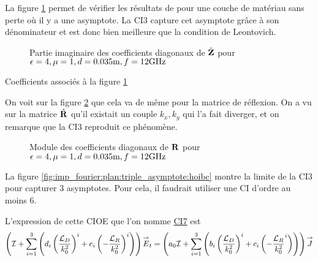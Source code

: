       La figure \ref{fig:imp_fourier:plan:soudais:hoibc} permet de vérifier les résultats de \cite[p.~11]{soudais_3d_2017} pour une couche de matériau sans perte où il y a une asymptote. La CI3 capture cet asymptote grâce à son dénominateur et est donc bien meilleure que la condition de Leontovich.
      \begin{figure}[!hbt]
          \centering
          
          \caption[CIOE sur empilement de P.~Soudais p.~11]{Partie imaginaire des coefficients diagonaux de \(\hat{\mathbf{Z}}\) pour \(\epsilon = 4, \mu = 1, d=0.035\text{m}, f=12\text{GHz}\)}
          \label{fig:imp_fourier:plan:soudais:hoibc}
      \end{figure}
      \begin{table}[!hbt]
        \centering
        \caption{Coefficients associés à la figure \ref{fig:imp_fourier:plan:soudais:hoibc}}
        \label{tab:imp_fourier:plan:soudais:hoibc}
      \end{table}

      On voit sur la figure \ref{fig:reflex_fourier:plan:soudais:hoibc} que cela va de même pour la matrice de réflexion. On a vu sur la matrice \(\hat{\mathbf{R}}\) qu'il existait un couple \(k_x,k_y\) qui l'a fait diverger, et on remarque que la CI3 reproduit ce phénomène.
      \begin{figure}[!hbt]
          \centering
          
          \caption[CIOE sur empilement de P.~Soudais p.~11]{Module des coefficients diagonaux de \(\mathbf{R}\) pour \(\epsilon = 4, \mu = 1, d=0.035\text{m}, f=12\text{GHz}\)}
          \label{fig:reflex_fourier:plan:soudais:hoibc}
      \end{figure}

      La figure \ref{fig:imp_fourier:plan:triple_asymptote:hoibc} montre la limite de la CI3 pour capturer 3 asymptotes. Pour cela, il faudrait utiliser une CI d'ordre au moins 6.

      L'expression de cette CIOE que l'on nomme \hyperlink{ci7}{CI7} est
      \begin{equation}
        \left({\mathcal{I}} + \sum_{i=1}^3 \left(d_{i} \left(\dfrac{{\mathcal{L}_D}}{k_0^2}\right)^i + e_{i} \left(-\dfrac{{\mathcal{L}_R}}{k_0^2}\right)^i \right)\right){\overset{\rightarrow}{E}}_t = \left(a_0 {\mathcal{I}} + \sum_{i=1}^3 \left(b_{i} \left(\dfrac{{\mathcal{L}_D}}{k_0^2}\right)^i + c_{i} \left(-\dfrac{{\mathcal{L}_R}}{k_0^2}^i\right) \right)\right){\overset{\rightarrow}{J}}
      \end{equation}


